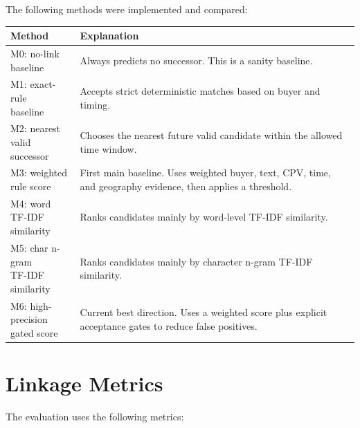 \documentclass[11pt,a4paper]{article}
\begin{document}
The following methods were implemented and compared:

\small
\begin{longtable}{p{}p{}}
\toprule
Method & Explanation \\
\midrule
\endhead
\makecell[l]{M0: no-link\\baseline} & Always predicts no successor. This is a sanity baseline. \\
\makecell[l]{M1: exact-rule\\baseline} & Accepts strict deterministic matches based on buyer and timing. \\
\makecell[l]{M2: nearest valid\\successor} & Chooses the nearest future valid candidate within the allowed time window. \\
\makecell[l]{M3: weighted\\rule score} & First main baseline. Uses weighted buyer, text, CPV, time, and geography evidence, then applies a threshold. \\
\makecell[l]{M4: word TF-IDF\\similarity} & Ranks candidates mainly by word-level TF-IDF similarity. \\
\makecell[l]{M5: char n-gram\\TF-IDF similarity} & Ranks candidates mainly by character n-gram TF-IDF similarity. \\
\makecell[l]{M6: high-precision\\gated score} & Current best direction. Uses a weighted score plus explicit acceptance gates to reduce false positives. \\
\bottomrule
\end{longtable}
\normalsize

\section*{Linkage Metrics}

The evaluation uses the following metrics:
\end{document}
